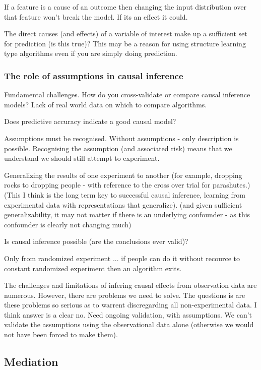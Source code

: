 \documentclass[11pt,a4paper]{article}
\begin{document}
If a feature is a cause of an outcome then changing the input distribution over that feature won't break the model. If its an effect it could.

The direct causes (and effects) of a variable of interest make up a sufficient set for prediction (is this true)? This may be a reason for using structure learning type algorithms even if you are simply doing prediction.

\subsubsection*{The role of assumptions in causal inference}

Fundamental challenges. How do you cross-validate or compare causal inference models? Lack of real world data on which to compare algorithms. 

Does predictive accuracy indicate a good causal model?

Assumptions must be recognised. Without assumptions - only description is possible. Recognising the assumption (and associated risk) means that we understand we should still attempt to experiment.

Generalizing the results of one experiment to another (for example, dropping rocks to dropping people - with reference to the cross over trial for parashutes.) (This I think is the long term key to successful causal inference, learning from experimental data with representations that generalize). (and given sufficient generalizability, it may not matter if there is an underlying confounder - as this confounder is clearly not changing much)

Is causal inference possible (are the conclusions ever valid)?

Only from randomized experiment ... if people can do it without recource to constant randomized experiment then an algorithm exits.

The challenges and limitations of infering causal effects from observation data are numerous. However, there are problems we need to solve. The questions is are these problems so serious as to warrent discregarding all non-experimental data. I think answer is a clear no. Need ongoing validation, with assumptions. We can't validate the assumptions using the observational data alone (otherwise we would not have been forced to make them).

\subsection*{Mediation}
\end{document}
